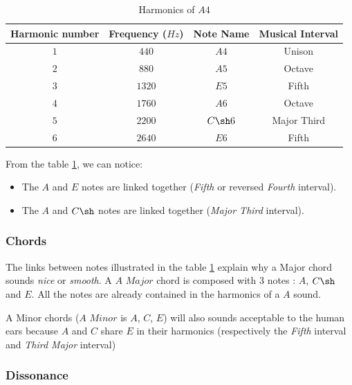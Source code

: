 \documentclass[12pt]{report}
\begin{document}
\begin{table} [ht]
    \begin{center}
        \begin{tabular} {c||c|c|c}
            Harmonic number & Frequency ($Hz$) & Note Name & Musical Interval \\
            \hline
            $1$ & $440$ & $A4$ & Unison \\
            $2$ & $880$ & $A5$ & Octave \\
            $3$ & $1320$ & $E5$ & Fifth \\
            $4$ & $1760$ & $A6$ & Octave \\
            $5$ & $2200$ & $C\sh6$ & Major Third \\
            $6$ & $2640$ & $E6$ & Fifth \\
        \end{tabular}
        \caption{Harmonics of $A4$}
        \label{tab:A4_harmonics}
    \end{center}
\end{table}

From the table \ref{tab:A4_harmonics}, we can notice:
\begin{itemize}
    \item The $A$ and $E$ notes are linked together (\textit{Fifth} or reversed \textit{Fourth} interval).
    \item The $A$ and $C\sh$ notes are linked together (\textit{Major Third} interval).
\end{itemize}


\subsubsection{Chords}

The links between notes illustrated in the table \ref{tab:A4_harmonics} explain why a Major chord sounds \textit{nice} or \textit{smooth}.
A $A$ $Major$ chord is composed with 3 notes : $A$, $C\sh$ and $E$. All the notes are already contained in the harmonics of a $A$ sound.

A Minor chords ($A$ $Minor$ is $A$, $C$, $E$) will also sounds acceptable to the human ears because $A$ and $C$ share $E$ in their harmonics (respectively the \textit{Fifth} interval and \textit{Third Major} interval) 

\subsubsection{Dissonance}
\end{document}
